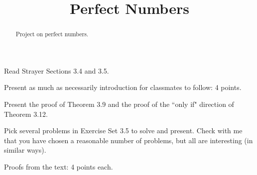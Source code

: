 \documentclass[letterpaper, 11 pt,handout]{ximera}
\title{Perfect Numbers}
\begin{document}
\begin{abstract}
 Project on perfect numbers.
\end{abstract}
\maketitle

Read Strayer Sections 3.4 and 3.5. 
\begin{rubric}
 Present as much as necessarily introduction for classmates to follow: 4 points.
\end{rubric}

Present the proof of Theorem 3.9 and the proof of the ``only if" direction of Theorem 3.12.

Pick several problems in Exercise Set 3.5 to solve and present. Check with me that you have chosen a reasonable number of problems, but all are interesting (in similar ways).

\begin{rubric}
Proofs from the text: 4 points each.
\end{rubric}
\end{document}
